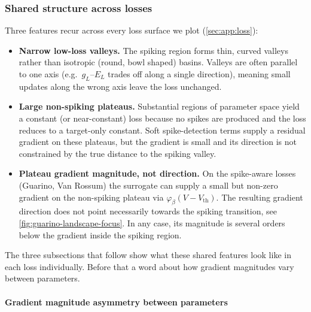 \subsubsection{Shared structure across losses}\label{sec:results:landscape:shared}
Three features recur across every loss surface we plot (\cref{sec:app:loss}):
\begin{itemize}
  \item \textbf{Narrow low-loss valleys.} The spiking region forms thin, curved valleys rather than isotropic (round, bowl shaped) basins.
        Valleys are often parallel to one axis (e.g.\ $g_L$--$E_L$ trades off along a single direction),
        meaning small updates along the wrong axis leave the loss unchanged.
  \item \textbf{Large non-spiking plateaus.} Substantial regions of parameter space yield a constant (or near-constant) loss because no spikes are produced and the loss reduces to a target-only constant.
        Soft spike-detection terms supply a residual gradient on these plateaus, but the gradient is small and its direction is not constrained by the true distance to the spiking valley.
  \item \textbf{Plateau gradient magnitude, not direction.} On the spike-aware losses (Guarino, Van Rossum) the surrogate can supply a small but non-zero gradient on the non-spiking plateau via $\varphi_\beta(V - V_{\mathrm{th}})$.
        The resulting gradient direction does not point necessarily towards the spiking transition, see \cref{fig:guarino-landscape-focus}.
        In any case, its magnitude is several orders below the gradient inside the spiking region.
\end{itemize}

The three subsections that follow show what these shared features look like in each loss individually.
Before that a word about how gradient magnitudes vary between parameters.

\paragraph*{Gradient magnitude asymmetry between parameters}

